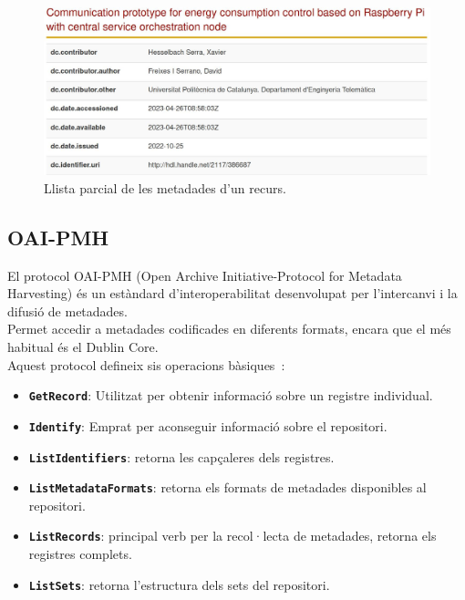 \begin{figure}[htbp]
    \centerline{\includegraphics[width=\textwidth]{figures/metadata-example}}
    \captionsetup{justification=centering}
    \caption{Llista parcial de les metadades d'un recurs.}\label{fig:metadata-example}
\end{figure}

\clearpage

\subsection{\gls{OAI-PMH}}\label{subsec:oai-pmh}

El protocol \gls{OAI-PMH} (Open Archive Initiative-Protocol for Metadata Harvesting) és un estàndard d'interoperabilitat desenvolupat per l'intercanvi i la difusió de metadades. \\

\noindent
Permet accedir a metadades codificades en diferents formats, encara que el més habitual és el Dublin Core. \\

\noindent
Aquest protocol defineix sis operacions bàsiques~\cite{oai-pmh}:

\begin{itemize}
    \item \textbf{\texttt{GetRecord}}: Utilitzat per obtenir informació sobre un registre individual.
    \item \texttt{\textbf{Identify}}: Emprat per aconseguir informació sobre el repositori.
    \item \texttt{\textbf{ListIdentifiers}}: retorna les capçaleres dels registres.
    \item \texttt{\textbf{ListMetadataFormats}}: retorna els formats de metadades disponibles al repositori.
    \item \texttt{\textbf{ListRecords}}: principal verb per la recol·lecta de metadades, retorna els registres complets.
    \item \texttt{\textbf{ListSets}}: retorna l’estructura dels sets del repositori.
\end{itemize}

